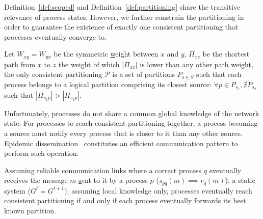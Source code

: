 Definition~\ref{def:scoped} and Definition~\ref{def:partitioning}
share the transitive relevance of process states. However, we further
constrain the partitioning in order to guarantee the existence of
exactly one consistent partitioning that processes eventually converge
to.

\begin{definition}
  Let $W_{xy} = W_{yx}$ be the symmetric \underline{w}eight between
  $x$ and $y$, $\Pi_{xz}$ be the shortest \underline{p}ath from $x$ to
  $z$ the weight of which $|\Pi_{xz}|$ is lower than any other path
  weight, the only consistent partitioning $\mathcal{P}$ is a set of
  partitions $P_{s\in S}$ such that each process belongs to a logical
  partition comprising its closest source: $\forall p \in P_{s_1},
  \nexists P_{s_2}$ such that $|\Pi_{s_1p}| > |\Pi_{s_2p}|$.
\end{definition}

Unfortunately, processes do not share a common global knowledge of the
network state. For processes to reach consistent partitioning
together, a process becoming a source must notify every process that
is closer to it than any other source. Epidemic
dissemination~\cite{birman1999bimodal} constitutes an efficient
communication pattern to perform such operation.

\begin{theorem}
  Assuming reliable communication links where a correct process $q$
  eventually receives the message $m$ \underline{s}ent to it by a
  process $p$ ($s_{pq}(m) \implies r_{q}(m)$); a static system ($G^t =
  G^{t+1}$); assuming local knowledge only, processes eventually reach
  consistent partitioning if and only if each process eventually
  forwards its best known partition.
\end{theorem}


